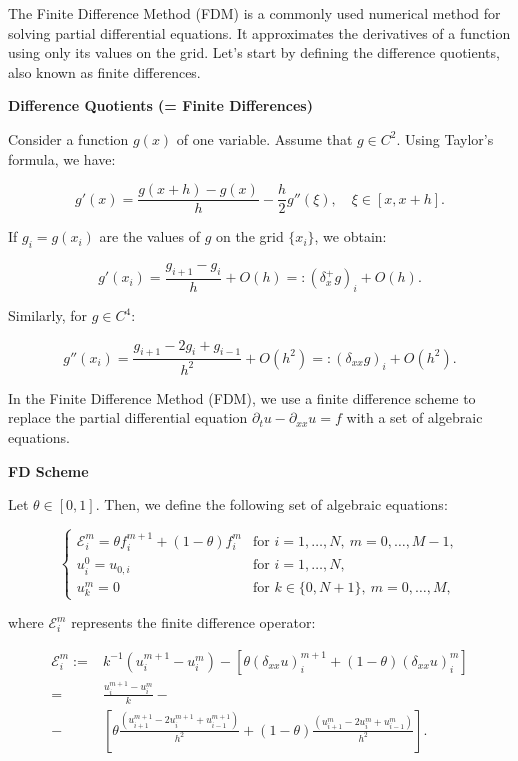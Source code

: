 The Finite Difference Method (FDM) is a commonly used numerical method for solving partial differential equations. It approximates the derivatives of a function using only its values on the grid. Let's start by defining the difference quotients, also known as finite differences.

\textbf{Difference Quotients (= Finite Differences)}

Consider a function $g(x)$ of one variable. Assume that $g \in C^2$. Using Taylor's formula, we have:

\begin{equation*}
g' (x) = \frac{g(x + h) - g(x)}{h} - \frac{h}{2} g''(\xi), \quad \xi \in [x, x + h].
\end{equation*}

If $g_i = g(x_i)$ are the values of $g$ on the grid $\{x_i\}$, we obtain:

\begin{equation*}
g' (x_i) = \frac{g_{i+1} - g_i}{h} + O(h) =: {(\delta^{+}_{x} g)}_i + O(h).
\end{equation*}

Similarly, for $g \in C^4$:

\begin{equation*}
g'' (x_i) = \frac{g_{i+1} - 2g_i + g_{i-1}}{h^2} + O(h^2) =: {(\delta_{xx}g)}_i + O(h^2).
\end{equation*}


In the Finite Difference Method (FDM), we use a finite difference scheme to replace the partial differential equation $\partial_t u - \partial_{xx}u = f$ with a set of algebraic equations.

\textbf{FD Scheme}

Let $\theta \in [0, 1]$. Then, we define the following set of algebraic equations:

\[
\begin{cases}
\mathcal{E}^{m}_{i} = \theta f^{m+1}_{i} + (1 - \theta) f^{m}_{i} & \text{for } i = 1, \ldots, N, \ m = 0, \ldots, M-1, \\
u^{0}_{i} = u_{0,i} & \text{for } i = 1, \ldots, N, \\
u^{m}_{k} = 0 & \text{for } k \in \{0, N+1\}, \ m = 0, \ldots, M,
\end{cases}
\]

where $\mathcal{E}^{m}_{i}$ represents the finite difference operator:

\begin{align*}
\mathcal{E}^{m}_{i} := & k^{-1} (u^{m+1}_{i} - u^{m}_{i}) - [\theta(\delta_{xx}u)^{m+1}_{i} + (1 - \theta)(\delta_{xx}u)^{m}_{i}] \\
= & \frac{u^{m+1}_{i} - u^{m}_{i}}{k} - \\
- & \left[\theta \frac{(u^{m+1}_{i+1} - 2u^{m+1}_{i} + u^{m+1}_{i-1})}{h^2} + (1 - \theta) \frac{(u^{m}_{i+1} - 2u^{m}_{i} + u^{m}_{i-1})}{h^2} \right].
\end{align*}

